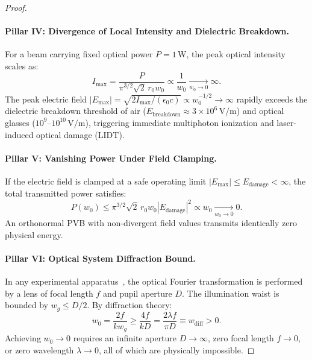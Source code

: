 \documentclass[11pt,a4paper]{article}
\begin{document}
\begin{proof}
\paragraph{Pillar IV: Divergence of Local Intensity and Dielectric Breakdown.}
For a beam carrying fixed optical power $P = 1\,\text{W}$, the peak optical intensity scales as:
\begin{equation}
\boxed{I_{\max} = \frac{P}{\pi^{3/2} \sqrt{2} \, r_0 w_0} \propto \frac{1}{w_0} \xrightarrow[w_0 \to 0]{} \infty.}
\end{equation}
The peak electric field $|E_{\max}| = \sqrt{2 I_{\max} / (\epsilon_0 c)} \propto w_0^{-1/2} \to \infty$ rapidly exceeds the dielectric breakdown threshold of air ($E_{\text{breakdown}} \approx 3 \times 10^6\,\text{V/m}$) and optical glasses ($10^9\text{--}10^{10}\,\text{V/m}$), triggering immediate multiphoton ionization and laser-induced optical damage (LIDT).

\paragraph{Pillar V: Vanishing Power Under Field Clamping.}
If the electric field is clamped at a safe operating limit $|E_{\max}| \le E_{\text{damage}} < \infty$, the total transmitted power satisfies:
\begin{equation}
P(w_0) \le \pi^{3/2} \sqrt{2} \, r_0 w_0 |E_{\text{damage}}|^2 \propto w_0 \xrightarrow[w_0 \to 0]{} 0.
\end{equation}
An orthonormal PVB with non-divergent field values transmits identically zero physical energy.

\paragraph{Pillar VI: Optical System Diffraction Bound.}
In any experimental apparatus~\cite{Vaity2015,Villalba2023}, the optical Fourier transformation is performed by a lens of focal length $f$ and pupil aperture $D$. The illumination waist is bounded by $w_g \le D/2$. By diffraction theory:
\begin{equation}
w_0 = \frac{2 f}{k w_g} \ge \frac{4 f}{k D} = \frac{2 \lambda f}{\pi D} \equiv w_{\text{diff}} > 0.
\end{equation}
Achieving $w_0 \to 0$ requires an infinite aperture $D \to \infty$, zero focal length $f \to 0$, or zero wavelength $\lambda \to 0$, all of which are physically impossible.


\end{proof}
\end{document}
